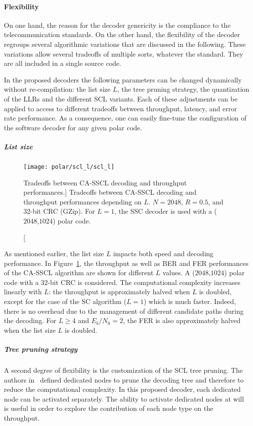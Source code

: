 \paragraph{Flexibility}

On one hand, the reason for the decoder genericity is the compliance to the
telecommunication standards. On the other hand, the flexibility of the decoder
regroups several algorithmic variations that are discussed in the following.
These variations allow several tradeoffs of multiple sorts, whatever the
standard. They are all included in a single source code.

In the proposed decoders the following parameters can be changed dynamically
without re-compilation: the list size $L$, the tree pruning strategy, the
quantization of the LLRs and the different SCL variants. Each of these
adjustments can be applied to access to different tradeoffs between throughput,
latency, and error rate performance. As a consequence, one can easily fine-tune
the configuration of the software decoder for any given polar code.

\subparagraph{List size}

\begin{figure}[htp]
  \centering
  \texttt{[image: polar/scl\_l/scl\_l]}
  \caption
    [Tradeoffs between CA-SSCL decoding and throughput performances.]
    {Tradeoffs between CA-SSCL decoding and throughput performances depending on
    $L$. $N=2048$, $R=0.5$, and 32-bit CRC (GZip). For $L=1$, the SSC decoder is
    used with a ($2048$,$1024$) polar code.}
  \label{plot:polar_scl_l}
\end{figure}

As mentioned earlier, the list size $L$ impacts both speed and decoding
performance. In Figure~\ref{plot:polar_scl_l}, the throughput as well as BER and
FER performances of the CA-SSCL algorithm are shown for different $L$ values. A
($2048$,$1024$) polar code with a 32-bit CRC is considered. The computational
complexity increases linearly with $L$: the throughput is approximately halved
when $L$ is doubled, except for the case of the SC algorithm ($L=1$) which is
much faster. Indeed, there is no overhead due to the management of different
candidate paths during the decoding. For $L\geq4$ and $E_b/N_0=2$, the FER is
also approximately halved when the list size $L$ is doubled.

\subparagraph{Tree pruning strategy}

A second degree of flexibility is the customization of the SCL tree pruning. The
authors in~\cite{Alamdar-Yazdi2011,Sarkis2016} defined dedicated nodes to prune
the decoding tree and therefore to reduce the computational complexity. In this
proposed decoder, each dedicated node can be activated separately. The ability
to activate dedicated nodes at will is useful in order to explore the
contribution of each node type on the throughput.

